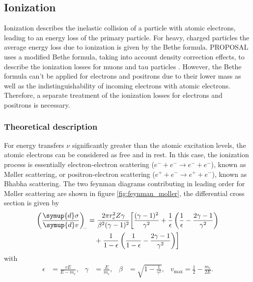\label{sec:electronprop}

\subsection{Ionization}
\label{sec:ionization}

Ionization describes the inelastic collision of a particle with atomic electrons, leading to an energy loss of the primary particle.
For heavy, charged particles the average energy loss due to ionization is given by the Bethe formula.
PROPOSAL uses a modified Bethe formula, taking into account density correction effects, to describe the ionization losses for muons and tau particles \cite{Kohne:2013zbq}.
However, the Bethe formula can't be applied for electrons and positrons due to their lower mass as well as the indistinguishability of incoming electrons with atomic electrons.
Therefore, a separate treatment of the ionization losses for electrons and positrons is necessary.

\subsubsection{Theoretical description}

For energy transfers $\nu$ significantly greater than the atomic excitation levels, the atomic electrons can be considered as free and in rest.
In this case, the ionization process is essentially electron-electron scattering ($e^- + e^- \rightarrow e^- + e^-$), known as M{\o}ller scattering, or positron-electron scattering ($e^+ + e^- \rightarrow e^+ + e^-$), known as Bhabha scattering.
The two feynman diagrams contributing in leading order for M{\o}ller scattering are shown in figure \ref{fig:feynman_moller}, the differential cross section \cite{PhysRev.93.38} is given by
%
\begin{equation}
	\begin{split}
	\label{eqn:moller}
	\left(\frac{\symup{d}\sigma}{\symup{d}v}\right)_{\!\!-} &= \frac{2 \pi r_e^2 Z \gamma}{\beta^2(\gamma - 1)^2} \biggl[ \frac{(\gamma - 1)^2}{\gamma^2} + \frac{1}{\epsilon} \left( \frac{1}{\epsilon} - \frac{2\gamma - 1}{\gamma^2} \right) \\ &\quad+ \frac{1}{1 - \epsilon} \left( \frac{1}{1 - \epsilon} - \frac{2 \gamma - 1}{\gamma^2} \right) \biggr]
	\end{split}
\end{equation}
%
with
%
\begin{align}
	\epsilon &= \frac{v E}{E - m_e},& \gamma &= \frac{E}{m_e}, & \beta &= \sqrt{1 - \frac{1}{\gamma^2}}, & v_{\text{max}} = \frac{1}{2} - \frac{m_e}{2 E}.
\end{align}

